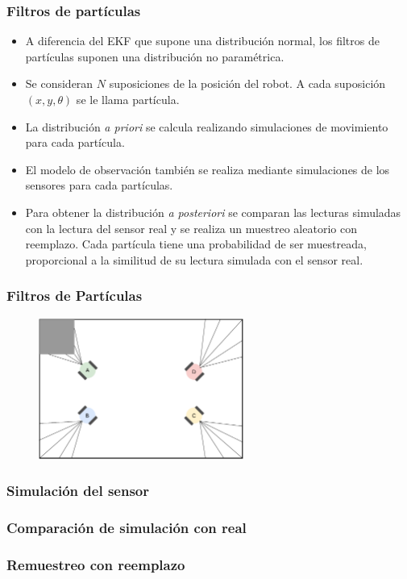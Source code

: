 \begin{frame}\frametitle{Filtros de partículas}
  \begin{itemize}
  \item A diferencia del EKF que supone una distribución normal, los filtros de partículas suponen una distribución no paramétrica.
  \item Se consideran $N$ suposiciones de la posición del robot. A cada suposición $(x,y,\theta)$ se le llama partícula. 
  \item La distribución \textit{a priori} se calcula realizando simulaciones de movimiento para cada partícula.
  \item El modelo de observación también se realiza mediante simulaciones de los sensores para cada partículas.
  \item Para obtener la distribución \textit{a posteriori} se comparan las lecturas simuladas con la lectura del sensor real y se realiza un muestreo aleatorio con reemplazo. Cada partícula tiene una probabilidad de ser muestreada, proporcional a la similitud de su lectura simulada con el sensor real.
  \end{itemize}
\end{frame}

\begin{frame}\frametitle{Filtros de Partículas}
  \begin{figure}
    \centering
    \includegraphics[width=0.6\textwidth]{Figures/ParticleFilter1.pdf}
  \end{figure}
\end{frame}

\begin{frame}\frametitle{Simulación del sensor}
\end{frame}

\begin{frame}\frametitle{Comparación de simulación con real}
\end{frame}

\begin{frame}\frametitle{Remuestreo con reemplazo}
\end{frame}

